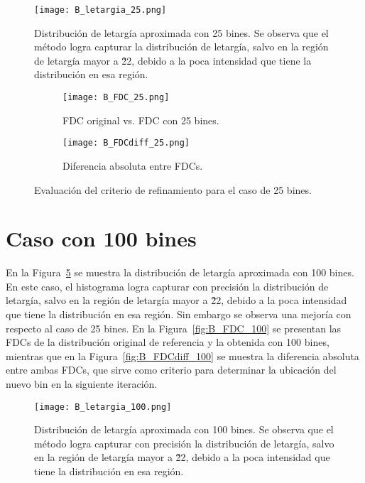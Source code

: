 \begin{figure}[H]
    \centering
    \texttt{[image: B\_letargia\_25.png]}
    \caption{Distribución de letargía aproximada con 25 bines. Se observa que el método logra capturar la distribución de letargía, salvo en la región de letargía mayor a \~ 22, debido a la poca intensidad que tiene la distribución en esa región.}
    \label{fig:B_letargia_25}
\end{figure}

\begin{figure}[H]
    \centering
    \begin{subfigure}[b]{0.46\textwidth}
        \texttt{[image: B\_FDC\_25.png]}
        \caption{FDC original vs. FDC con 25 bines.}
        \label{fig:B_FDC_25}
    \end{subfigure}
    \hfill
    \begin{subfigure}[b]{0.46\textwidth}
        \texttt{[image: B\_FDCdiff\_25.png]}
        \caption{Diferencia absoluta entre FDCs.}
        \label{fig:B_FDCdiff_25}
    \end{subfigure}
    \caption{Evaluación del criterio de refinamiento para el caso de 25 bines.}
    \label{fig:B_FDC_25_25}
\end{figure}

\section*{Caso con 100 bines}

En la Figura~\ref{fig:B_letargia_100} se muestra la distribución de letargía aproximada con 100 bines. En este caso, el histograma logra capturar con precisión la distribución de letargía, salvo en la región de letargía mayor a \~ 22, debido a la poca intensidad que tiene la distribución en esa región. Sin embargo se observa una mejoría con respecto al caso de 25 bines. En la Figura~\ref{fig:B_FDC_100} se presentan las FDCs de la distribución original de referencia y la obtenida con 100 bines, mientras que en la Figura~\ref{fig:B_FDCdiff_100} se muestra la diferencia absoluta entre ambas FDCs, que sirve como criterio para determinar la ubicación del nuevo bin en la siguiente iteración.


\begin{figure}[H]
    \centering
    \texttt{[image: B\_letargia\_100.png]}
    \caption{Distribución de letargía aproximada con 100 bines. Se observa que el método logra capturar con precisión la distribución de letargía, salvo en la región de letargía mayor a \~ 22, debido a la poca intensidad que tiene la distribución en esa región.}
    \label{fig:B_letargia_100}
\end{figure}

